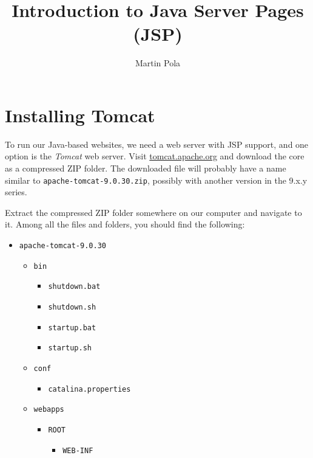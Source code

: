 \documentclass[a4paper, english]{article}
\title{Introduction to Java Server Pages (JSP)}
\author{Martin Pola}
\date{}
\newcommand{\tomcatfolder}{apache-tomcat-9.0.30}
\begin{document}
    \maketitle

    \section{Installing Tomcat}
        To run our Java-based websites, we need a web server with JSP support, and one option is the \emph{Tomcat} web server. Visit \href{https://tomcat.apache.org/}{tomcat.apache.org} and download the core as a compressed ZIP folder. The downloaded file will probably have a name similar to \texttt{\tomcatfolder.zip}, possibly with another version in the 9.x.y series.

        Extract the compressed ZIP folder somewhere on our computer and navigate to it. Among all the files and folders, you should find the following:

        \begin{itemize}
            \item \texttt{\tomcatfolder}
            \begin{itemize}
                \item \texttt{bin}
                \begin{itemize}
                    \item \texttt{shutdown.bat}
                    \item \texttt{shutdown.sh}
                    \item \texttt{startup.bat}
                    \item \texttt{startup.sh}
                \end{itemize}
                \item \texttt{conf}
                \begin{itemize}
                    \item \texttt{catalina.properties}
                \end{itemize}
                \item \texttt{webapps}
                \begin{itemize}
                    \item \texttt{ROOT}
                    \begin{itemize}
                        \item \texttt{WEB-INF}
                    \end{itemize}
                \end{itemize}
            \end{itemize}
        \end{itemize}
\end{document}
